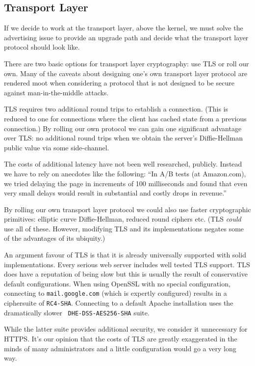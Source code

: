 \documentclass[conference]{IEEEtran}
\begin{document}
\subsection{Transport Layer}

If we decide to work at the transport layer, above the kernel, we must
solve the advertising issue to provide an upgrade path and decide what the
transport layer protocol should look like.

There are two basic options for transport layer cryptography: use
TLS or roll our own. Many of the caveats about designing one's own transport
layer protocol are rendered moot when considering a protocol that is not
designed to be secure against man-in-the-middle attacks.

TLS requires two additional round trips to establish a connection. (This is
reduced to one for connections where the client has cached state from a
previous connection.) By rolling our own protocol we can gain one significant
advantage over TLS: no additional round trips when we obtain the server's
Diffie-Hellman public value via some side-channel.

The costs of additional latency have not been well researched, publicly.
Instead we have to rely on anecdotes like the following: ``In A/B tests (at
Amazon.com), we tried delaying the page in increments of 100 milliseconds and
found that even very small delays would result in substantial and costly drops
in revenue.''\cite{latency}

By rolling our own transport layer protocol we could also use faster
cryptographic primitives: elliptic curve Diffie-Hellman, reduced round ciphers
etc. (TLS {\it could} use all of these. However, modifying TLS and its
implementations negates some of the advantages of its ubiquity.)

An argument favour of TLS is that it is already universally supported with
solid implementations. Every serious web server includes well tested TLS
support. TLS does have a reputation of being slow but this is usually the
result of conservative default configurations. When using OpenSSL with no special
configuration, connecting to {\tt mail.google.com} (which is expertly
configured) results in a ciphersuite of {\tt RC4-SHA}. Connecting to
a default Apache installation uses the dramatically slower {\tt
DHE-DSS-AES256-SHA} suite.

While the latter suite provides additional security, we consider it
unnecessary for HTTPS. It's our opinion that the costs of
TLS are greatly exaggerated in the minds of many administrators and a little
configuration would go a very long way.
\end{document}
